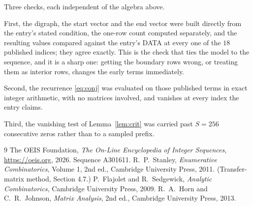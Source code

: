 \documentclass[11pt,a4paper]{article}
\theoremstyle{plain}
\theoremstyle{definition}
\begin{document}
Three checks, each independent of the algebra above.

First, the digraph, the start vector and the end vector were built directly from the
entry's stated condition, the one-row count computed separately, and the resulting values
compared against the entry's DATA at every one of the $18$ published indices; they
agree exactly. This is the check that ties the model to the sequence, and it is a sharp one:
getting the boundary rows wrong, or treating them as interior rows, changes the early terms
immediately.

Second, the recurrence \eqref{eq:conj} was evaluated on those published terms in exact
integer arithmetic, with no matrices involved, and vanishes at every index the entry claims.

Third, the vanishing test of Lemma~\ref{lem:crit} was carried past $S=256$ consecutive
zeros rather than to a sampled prefix.

\begin{thebibliography}{9}
 The OEIS Foundation, \emph{The On-Line Encyclopedia of Integer
Sequences}, \url{https://oeis.org}, 2026. Sequence A301611.
 R.~P.~Stanley, \emph{Enumerative Combinatorics}, Volume 1, 2nd ed.,
Cambridge University Press, 2011. (Transfer-matrix method, Section 4.7.)
 P.~Flajolet and R.~Sedgewick, \emph{Analytic Combinatorics}, Cambridge
University Press, 2009.
 R.~A.~Horn and C.~R.~Johnson, \emph{Matrix Analysis}, 2nd ed., Cambridge
University Press, 2013.
\end{thebibliography}
\end{document}
